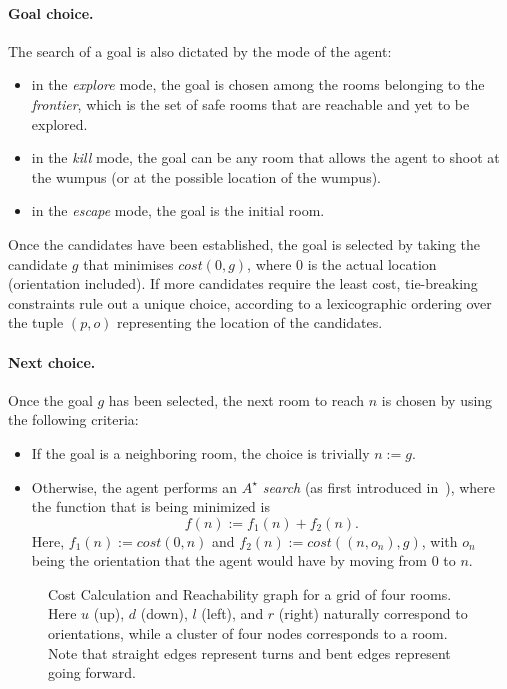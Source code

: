 \documentclass{llncs}
\begin{document}
\paragraph{Goal choice.} The search of a goal is also dictated by the mode of the agent:
\begin{itemize}
	\item in the \emph{explore} mode, the goal is chosen among the rooms belonging to the \emph{frontier}, which is the set of safe rooms that are reachable and yet to be explored.
	\item in the \emph{kill} mode, the goal can be any room that allows the agent to shoot at the wumpus (or at the possible location of the wumpus).
	\item in the \emph{escape} mode, the goal is the initial room.
\end{itemize}
Once the candidates have been established, the goal is selected by taking the candidate $g$ that minimises $cost(0,g)$, where $0$ is the actual location (orientation included).
If more candidates require the least cost, tie-breaking constraints rule out a unique choice, according to a lexicographic ordering over the tuple $(p,o)$ representing the location of the candidates.

\paragraph{Next choice.} Once the goal $g$ has been selected, the next room to reach $n$ is chosen by using the following criteria:
\begin{itemize}
	\item If the goal is a neighboring room, the choice is trivially $n := g$.
	\item Otherwise, the agent performs an \emph{$A^{\star}$ search} (as first introduced in~\cite{AStar}), where the function that is being minimized is
	$$
	f(n) := f_1(n) + f_2(n).
	$$
	Here, $f_1(n) := cost(0,n)$ and $f_2(n) := cost((n,o_n),g)$, with $o_n$ being the orientation that the agent would have by moving from $0$ to $n$.
\end{itemize}

\begin{figure}
	\begin{center}
		
	\end{center}
	\caption[Cost Calculation and Reachability graph]{Cost Calculation and Reachability graph for a grid of four rooms. Here $u$ (up), $d$ (down), $l$ (left), and $r$ (right) naturally correspond to orientations, while a cluster of four nodes corresponds to a room. Note that straight edges represent turns and bent edges represent going forward.}
	\label{fig:graph}
\end{figure}
\end{document}
